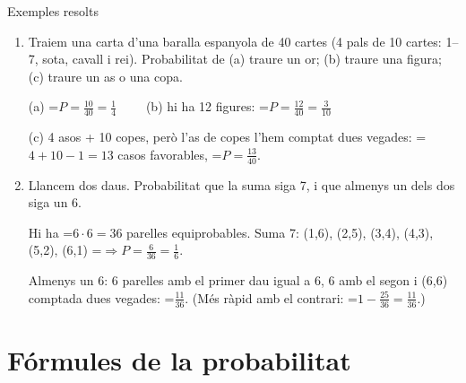 \documentclass[11pt,a4paper]{article}
\newcommand{\fmm}[1]{\setbox0=\hbox{$#1$}\ifdim\wd0>\linewidth\[#1\]\else\mbox{\box0}\fi}
\begin{document}
  
\begin{fmex}{Exemples resolts}
\begin{enumerate}[label=\textbf{\arabic*.},leftmargin=*]
\item Traiem una carta d'una baralla espanyola de 40 cartes (4 pals de 10 cartes: 1--7, sota, cavall i rei). Probabilitat de (a) traure un or; (b) traure una figura; (c) traure un as o una copa.
          

            

(a) \fmm{P=\frac{10}{40}=\frac14\qquad} (b) hi ha 12 figures: \fmm{P=\frac{12}{40}=\frac{3}{10}}

            

(c) 4 asos + 10 copes, però l'as de copes l'hem comptat dues vegades: \fmm{4+10-1=13} casos favorables, \fmm{P=\frac{13}{40}}.
\item Llancem dos daus. Probabilitat que la suma siga 7, i que almenys un dels dos siga un 6.
          

            

Hi ha \fmm{6\cdot6=36} parelles equiprobables. Suma 7: (1,6), (2,5), (3,4), (4,3), (5,2), (6,1) \fmm{\Rightarrow P=\frac{6}{36}=\frac16}.

            

Almenys un 6: 6 parelles amb el primer dau igual a 6, 6 amb el segon i (6,6) comptada dues vegades: \fmm{\frac{11}{36}}. (Més ràpid amb el contrari: \fmm{1-\frac{25}{36}=\frac{11}{36}}.)
\end{enumerate}
\end{fmex}

  
\section{Fórmules de la probabilitat}\hypertarget{sec5}{}

  
\end{document}
